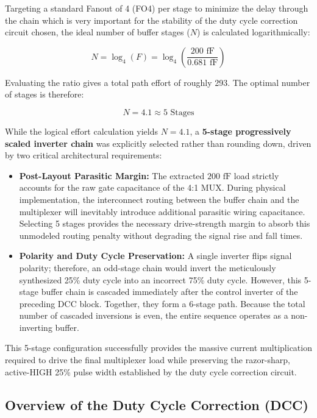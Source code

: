 Targeting a standard Fanout of 4 (FO4) per stage to minimize the delay through the chain which is very important for the stability of the duty cycle correction circuit chosen, the ideal number of buffer stages ($N$) is calculated logarithmically:

$$N = \log_4(F) = \log_4 \left( \frac{200\text{ fF}}{0.681\text{ fF}} \right)$$

Evaluating the ratio gives a total path effort of roughly 293. The optimal number of stages is therefore:

$$N = 4.1 \approx 5 \text{ Stages}$$

While the logical effort calculation yields $N = 4.1$, a \textbf{5-stage progressively scaled inverter chain} was explicitly selected rather than rounding down, driven by two critical architectural requirements:

\begin{itemize}
    \item \textbf{Post-Layout Parasitic Margin:} The extracted $200\text{ fF}$ load strictly accounts for the raw gate capacitance of the 4:1 MUX. During physical implementation, the interconnect routing between the buffer chain and the multiplexer will inevitably introduce additional parasitic wiring capacitance. Selecting 5 stages provides the necessary drive-strength margin to absorb this unmodeled routing penalty without degrading the signal rise and fall times.
    
    \item \textbf{Polarity and Duty Cycle Preservation:} A single inverter flips signal polarity; therefore, an odd-stage chain would invert the meticulously synthesized 25\% duty cycle into an incorrect 75\% duty cycle. However, this 5-stage buffer chain is cascaded immediately after the control inverter of the preceding DCC block. Together, they form a 6-stage path. Because the total number of cascaded inversions is even, the entire sequence operates as a non-inverting buffer. 
\end{itemize}

This 5-stage configuration successfully provides the massive current multiplication required to drive the final multiplexer load while preserving the razor-sharp, active-HIGH 25\% pulse width established by the duty cycle correction circuit.

\subsection{Overview of the Duty Cycle Correction (DCC)}

